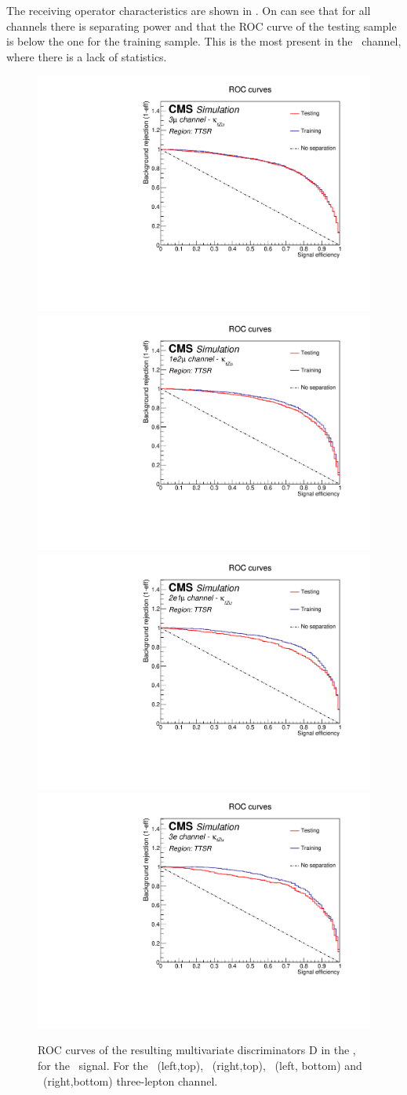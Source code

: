 The receiving operator characteristics are shown in . On can see that for all channels there is separating power and that the ROC curve of the testing sample is below the one for the training sample. This is the most present in the \eee\ channel, where there is a lack of statistics. 
\begin{figure}[htbp]
	\centering
	\includegraphics[width=0.49\linewidth]{6_Search/Figures/PlotsTechnics/ROCZuttoppairuuu}
	\includegraphics[width=0.49\linewidth]{6_Search/Figures/PlotsTechnics/ROCZuttoppairuue}
	\includegraphics[width=0.49\linewidth]{6_Search/Figures/PlotsTechnics/ROCZuttoppaireeu}
	\includegraphics[width=0.49\linewidth]{6_Search/Figures/PlotsTechnics/ROCZuttoppaireee}
	\caption{ROC curves of the resulting  multivariate discriminators D in the \TTSR, for the \Zut\ signal. For the \mumumu\ (left,top), \emumu\ (right,top), \eemu\ (left, bottom) and \eee\ (right,bottom) three-lepton channel.}
	\label{fig:roczuttoppair}
\end{figure}


